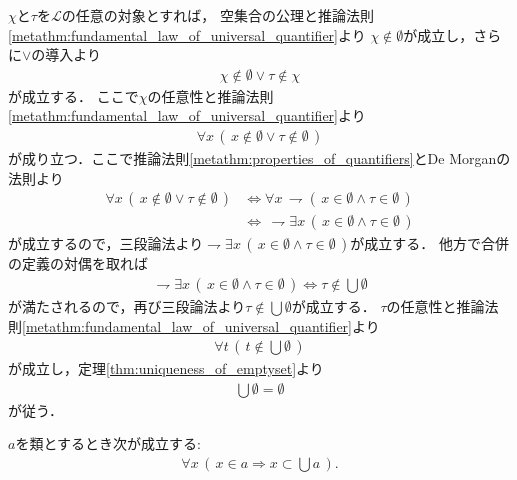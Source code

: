 	\begin{prf}
				$\chi$と$\tau$を$\mathcal{L}$の任意の対象とすれば，
				空集合の公理と推論法則\ref{metathm:fundamental_law_of_universal_quantifier}より
				$\chi \notin \emptyset$が成立し，さらに$\vee$の導入より
				\begin{align}
					\chi \notin \emptyset \vee \tau \notin \chi
				\end{align}
				が成立する．
				ここで$\chi$の任意性と推論法則\ref{metathm:fundamental_law_of_universal_quantifier}より
				\begin{align}
					\forall x\, (\, x \notin \emptyset \vee \tau \notin \emptyset\, )
				\end{align}
				が成り立つ．ここで推論法則\ref{metathm:properties_of_quantifiers}とDe Morganの法則より
				\begin{align}
					\forall x\, (\, x \notin \emptyset \vee \tau \notin \emptyset\, )
					&\Longleftrightarrow \forall x\, \rightharpoondown (\, x \in \emptyset \wedge \tau \in \emptyset\, ) \\
					&\Longleftrightarrow\, \rightharpoondown \exists x\, (\, x \in \emptyset \wedge \tau \in \emptyset\, )
				\end{align}
				が成立するので，三段論法より$\rightharpoondown \exists x\, (\, x \in \emptyset \wedge \tau \in \emptyset\, )$が成立する．
				他方で合併の定義の対偶を取れば
				\begin{align}
					\rightharpoondown \exists x\, (\, x \in \emptyset \wedge \tau \in \emptyset\, )
					\Longleftrightarrow \tau \notin \bigcup \emptyset
				\end{align}
				が満たされるので，再び三段論法より$\tau \notin \bigcup \emptyset$が成立する．
				$\tau$の任意性と推論法則\ref{metathm:fundamental_law_of_universal_quantifier}より
				\begin{align}
					\forall t\, (\, t \notin \bigcup \emptyset\, )
				\end{align}
				が成立し，定理\ref{thm:uniqueness_of_emptyset}より
				\begin{align}
					\bigcup \emptyset = \emptyset
				\end{align}
				が従う．
				\QED
	\end{prf}
	
	\begin{screen}
		\begin{thm}[合併は任意の要素より大きい]\label{thm:union_is_bigger_than_any_member}
			$a$を類とするとき次が成立する:
			\begin{align}
				\forall x\, (\, x \in a \Longrightarrow x \subset \bigcup a\, ).
			\end{align}
		\end{thm}
	\end{screen}
	

